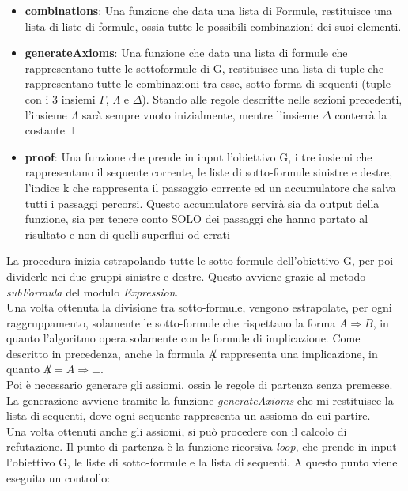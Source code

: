 \documentclass[\main/tesi.tex]{subfiles}
\begin{document}
\begin{itemize}
\begin{itemize}
              \item \textbf{combinations}: Una funzione che data una lista di Formule, restituisce una lista di liste di formule, ossia tutte le possibili combinazioni dei suoi elementi.
              \item \textbf{generateAxioms}: Una funzione che data una lista di formule che rappresentano tutte le sottoformule di G, restituisce una lista di tuple che rappresentano tutte le combinazioni tra esse, sotto forma di sequenti (tuple con i 3 insiemi $\Gamma$, $\Lambda$ e $\Delta$). Stando alle regole descritte nelle sezioni precedenti, l'insieme $\Lambda$ sarà sempre vuoto inizialmente, mentre l'insieme $\Delta$ conterrà la costante $\bot$
              \item \textbf{proof}: Una funzione che prende in input l'obiettivo G, i tre insiemi che rappresentano il sequente corrente, le liste di sotto-formule sinistre e destre, l'indice k che rappresenta il passaggio corrente ed un accumulatore che salva tutti i passaggi percorsi. Questo accumulatore servirà sia da output della funzione, sia per tenere conto SOLO dei passaggi che hanno portato al risultato e non di quelli superflui od errati
          \end{itemize}
\end{itemize}
La procedura inizia estrapolando tutte le sotto-formule dell'obiettivo G, per poi dividerle nei due gruppi sinistre e destre. Questo avviene grazie al metodo \textit{subFormula} del modulo \textit{Expression}. \\
Una volta ottenuta la divisione tra sotto-formule, vengono estrapolate, per ogni raggruppamento, solamente le sotto-formule che rispettano la forma $A \Rightarrow B$, in quanto l'algoritmo opera solamente con le formule di implicazione. Come descritto in precedenza, anche la formula $\not A$ rappresenta una implicazione, in quanto $\not A = A \Rightarrow \bot$. \\
Poi è necessario generare gli assiomi, ossia le regole di partenza senza premesse. La generazione avviene tramite la funzione \textit{generateAxioms} che mi restituisce la lista di sequenti, dove ogni sequente rappresenta un assioma da cui partire. \\
Una volta ottenuti anche gli assiomi, si può procedere con il calcolo di refutazione. Il punto di partenza è la funzione ricorsiva \textit{loop}, che prende in input l'obiettivo G, le liste di sotto-formule e la lista di sequenti. A questo punto viene eseguito un controllo:
\end{document}
